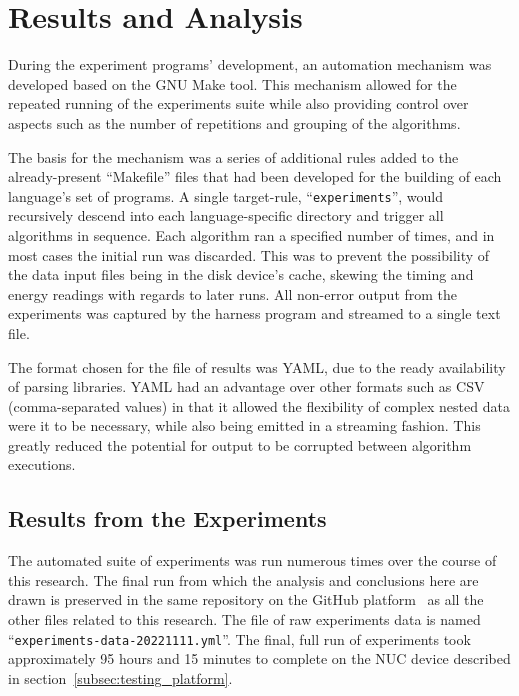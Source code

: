 \section{Results and Analysis}
\label{sec:results}

During the experiment programs' development, an automation mechanism was developed based on the GNU Make tool. This mechanism allowed for the repeated running of the experiments suite while also providing control over aspects such as the number of repetitions and grouping of the algorithms.

The basis for the mechanism was a series of additional rules added to the already-present ``Makefile'' files that had been developed for the building of each language's set of programs. A single target-rule, ``\texttt{experiments}'', would recursively descend into each language-specific directory and trigger all algorithms in sequence. Each algorithm ran a specified number of times, and in most cases the initial run was discarded. This was to prevent the possibility of the data input files being in the disk device's cache, skewing the timing and energy readings with regards to later runs. All non-error output from the experiments was captured by the harness program and streamed to a single text file.

The format chosen for the file of results was YAML, due to the ready availability of parsing libraries. YAML had an advantage over other formats such as CSV (comma-separated values) in that it allowed the flexibility of complex nested data were it to be necessary, while also being emitted in a streaming fashion. This greatly reduced the potential for output to be corrupted between algorithm executions.

\subsection{Results from the Experiments}
\label{subsec:results}

The automated suite of experiments was run numerous times over the course of this research. The final run from which the analysis and conclusions here are drawn is preserved in the same repository on the GitHub platform~\cite{github} as all the other files related to this research. The file of raw experiments data is named ``\texttt{experiments-data-20221111.yml}''. The final, full run of experiments took approximately 95 hours and 15 minutes to complete on the NUC device described in section~\ref{subsec:testing_platform}.

